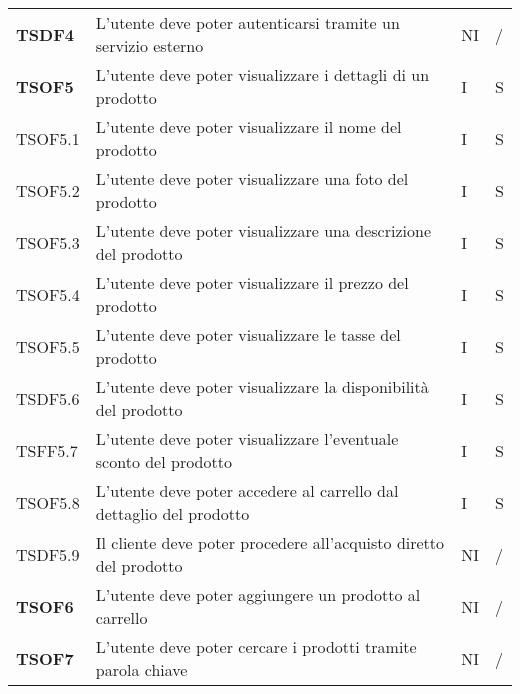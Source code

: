 \begin{center}
\begin{longtable}[!h]{p{60px} p{240px} p{35px} p{35px}}
        \textbf{TSDF4}  & L'utente deve poter autenticarsi tramite un servizio esterno                                        & NI             & /              \\
        \textbf{TSOF5}  & L'utente deve poter visualizzare i dettagli di un prodotto                                          & I              & S              \\
        TSOF5.1         & L'utente deve poter visualizzare il nome del prodotto                                               & I              & S              \\
        TSOF5.2         & L'utente deve poter visualizzare una foto del prodotto                                              & I              & S              \\
        TSOF5.3         & L'utente deve poter visualizzare una descrizione del prodotto                                       & I              & S              \\
        TSOF5.4         & L'utente deve poter visualizzare il prezzo del prodotto                                             & I              & S              \\
        TSOF5.5         & L'utente deve poter visualizzare le tasse del prodotto                                              & I              & S              \\
        TSDF5.6         & L'utente deve poter visualizzare la disponibilità del prodotto                                      & I              & S              \\
        TSFF5.7         & L'utente deve poter visualizzare l'eventuale sconto del prodotto                                    & I              & S              \\
        TSOF5.8         & L'utente deve poter accedere al carrello dal dettaglio del prodotto                                 & I              & S              \\
        TSDF5.9         & Il cliente deve poter procedere all'acquisto diretto del prodotto                                   & NI             & /              \\
        \textbf{TSOF6}  & L'utente deve poter aggiungere un prodotto al carrello                                              & NI             & /              \\
        \textbf{TSOF7}  & L'utente deve poter cercare i prodotti tramite parola chiave                                        & NI             & /              \\

\end{longtable}
\end{center}
